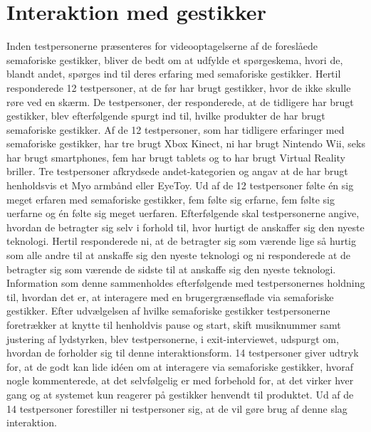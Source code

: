 \section{Interaktion med gestikker}
\label{TestresultaterInteraktioner}
%
Inden testpersonerne præsenteres for videooptagelserne af de foreslåede semaforiske gestikker, bliver de bedt om at udfylde et spørgeskema, hvori de, blandt andet, spørges ind til deres erfaring med semaforiske gestikker. Hertil responderede 12 testpersoner, at de før har brugt gestikker, hvor de ikke skulle røre ved en skærm. De testpersoner, der responderede, at de tidligere har brugt gestikker, blev efterfølgende spurgt ind til, hvilke produkter de har brugt semaforiske gestikker. Af de 12 testpersoner, som har tidligere erfaringer med semaforiske gestikker, har tre brugt Xbox Kinect, ni har brugt Nintendo Wii, seks har brugt smartphones, fem har brugt tablets og to har brugt Virtual Reality briller. Tre testpersoner afkrydsede andet-kategorien og angav at de har brugt henholdsvis et Myo armbånd eller EyeToy. Ud af de 12 testpersoner følte én sig meget erfaren med semaforiske gestikker, fem følte sig erfarne, fem følte sig uerfarne og én følte sig meget uerfaren. Efterfølgende skal testpersonerne angive, hvordan de betragter sig selv i forhold til, hvor hurtigt de anskaffer sig den nyeste teknologi. Hertil responderede ni, at de betragter sig som værende lige så hurtig som alle andre til at anskaffe sig den nyeste teknologi og ni responderede at de betragter sig som værende de sidste til at anskaffe sig den nyeste teknologi. Information som denne sammenholdes efterfølgende med testpersonernes holdning til, hvordan det er, at interagere med en brugergrænseflade via semaforiske gestikker.\blankline
%
Efter udvælgelsen af hvilke semaforiske gestikker testpersonerne foretrækker at knytte til henholdvis pause og start, skift musiknummer samt justering af lydstyrken, blev testpersonerne, i exit-interviewet, udspurgt om, hvordan de forholder sig til denne interaktionsform. 14 testpersoner giver udtryk for, at de godt kan lide idéen om at interagere via semaforiske gestikker, hvoraf nogle kommenterede, at det selvfølgelig er med forbehold for, at det virker hver gang og at systemet kun reagerer på gestikker henvendt til produktet. Ud af de 14 testpersoner forestiller ni testpersoner sig, at de vil gøre brug af denne slag interaktion.

